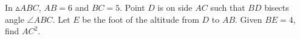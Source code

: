 In $\vartriangle ABC$, $AB = 6$ and $BC = 5$. Point $D$ is on side $AC$ such that $BD$ bisects angle $\angle ABC$. Let $E$ be the foot of the altitude from $D$ to $AB$. Given $BE = 4$, find $AC^2$.
